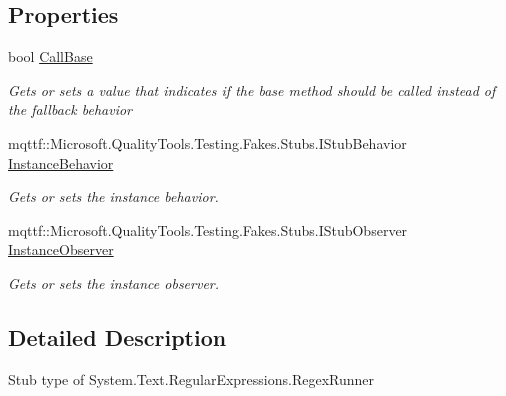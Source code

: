 \subsection*{Properties}
\begin{DoxyCompactItemize}
\item 
bool \hyperlink{class_system_1_1_text_1_1_regular_expressions_1_1_fakes_1_1_stub_regex_runner_a7d4df0fccd115db34edcf278d0f9ad35}{Call\-Base}
\begin{DoxyCompactList}\small\item\em Gets or sets a value that indicates if the base method should be called instead of the fallback behavior\end{DoxyCompactList}\item 
mqttf\-::\-Microsoft.\-Quality\-Tools.\-Testing.\-Fakes.\-Stubs.\-I\-Stub\-Behavior \hyperlink{class_system_1_1_text_1_1_regular_expressions_1_1_fakes_1_1_stub_regex_runner_a0694eae3e2126eb73cbf9feec7e176bc}{Instance\-Behavior}
\begin{DoxyCompactList}\small\item\em Gets or sets the instance behavior.\end{DoxyCompactList}\item 
mqttf\-::\-Microsoft.\-Quality\-Tools.\-Testing.\-Fakes.\-Stubs.\-I\-Stub\-Observer \hyperlink{class_system_1_1_text_1_1_regular_expressions_1_1_fakes_1_1_stub_regex_runner_adccfc08a97092551ebed7f608d5459bf}{Instance\-Observer}
\begin{DoxyCompactList}\small\item\em Gets or sets the instance observer.\end{DoxyCompactList}\end{DoxyCompactItemize}


\subsection{Detailed Description}
Stub type of System.\-Text.\-Regular\-Expressions.\-Regex\-Runner



